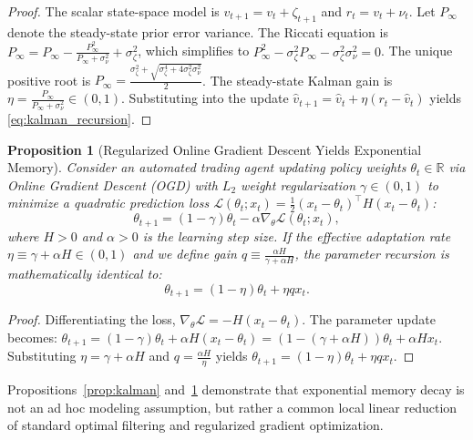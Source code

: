 \documentclass[12pt]{article}
\newtheorem{proposition}[theorem]{Proposition}
\theoremstyle{definition}
\theoremstyle{remark}
\newcommand{\R}{\mathbb{R}}
\begin{document}
\begin{proof}
The scalar state-space model is $v_{t+1} = v_t + \zeta_{t+1}$ and $r_t = v_t + \nu_t$. Let $P_{\infty}$ denote the steady-state prior error variance. The Riccati equation is $P_\infty = P_\infty - \frac{P_\infty^2}{P_\infty + \sigma_\nu^2} + \sigma_\zeta^2$, which simplifies to $P_\infty^2 - \sigma_\zeta^2 P_\infty - \sigma_\zeta^2 \sigma_\nu^2 = 0$. The unique positive root is $P_\infty = \frac{\sigma_\zeta^2 + \sqrt{\sigma_\zeta^4 + 4\sigma_\zeta^2 \sigma_\nu^2}}{2}$. The steady-state Kalman gain is $\eta = \frac{P_\infty}{P_\infty + \sigma_\nu^2} \in (0, 1)$. Substituting into the update $\hat{v}_{t+1} = \hat{v}_t + \eta (r_t - \hat{v}_t)$ yields \eqref{eq:kalman_recursion}.
\end{proof}

\begin{proposition}[Regularized Online Gradient Descent Yields Exponential Memory]
\label{prop:ogd}
Consider an automated trading agent updating policy weights $\theta_t \in \R$ via Online Gradient Descent (OGD) with $L_2$ weight regularization $\gamma \in (0, 1)$ to minimize a quadratic prediction loss $\mathcal{L}(\theta_t; x_t) = \frac{1}{2} (x_t - \theta_t)^\top H (x_t - \theta_t)$:
\begin{equation}
\theta_{t+1} = (1 - \gamma) \theta_t - \alpha \nabla_\theta \mathcal{L}(\theta_t; x_t),
\end{equation}
where $H>0$ and $\alpha > 0$ is the learning step size. If the effective adaptation rate $\eta \equiv \gamma + \alpha H \in (0, 1)$ and we define gain $q \equiv \frac{\alpha H}{\gamma + \alpha H}$, the parameter recursion is mathematically identical to:
\begin{equation}
\theta_{t+1} = (1 - \eta) \theta_t + \eta q x_t.
\end{equation}
\end{proposition}

\begin{proof}
Differentiating the loss, $\nabla_\theta \mathcal{L} = -H(x_t - \theta_t)$. The parameter update becomes:
$\theta_{t+1} = (1 - \gamma)\theta_t + \alpha H (x_t - \theta_t) = (1 - (\gamma + \alpha H))\theta_t + \alpha H x_t$.
Substituting $\eta = \gamma + \alpha H$ and $q = \frac{\alpha H}{\eta}$ yields $\theta_{t+1} = (1 - \eta)\theta_t + \eta q x_t$.
\end{proof}

Propositions~\ref{prop:kalman} and~\ref{prop:ogd} demonstrate that exponential memory decay is not an ad hoc modeling assumption, but rather a common local linear reduction of standard optimal filtering and regularized gradient optimization.
\end{document}
